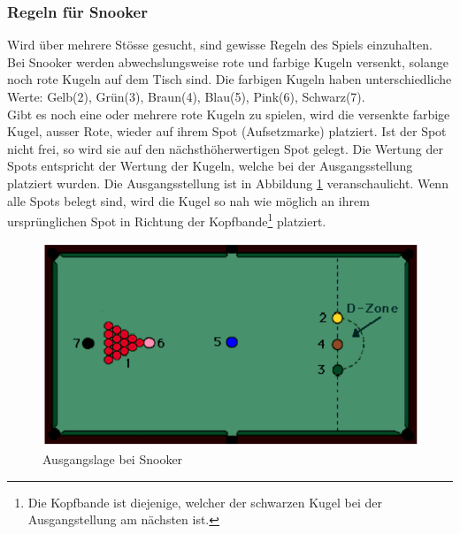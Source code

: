 \subsubsection{Regeln für Snooker}\label{kap:tiefensuche:regeln_fuer_snooker}
Wird über mehrere Stösse gesucht, sind gewisse Regeln des Spiels einzuhalten. Bei Snooker werden abwechslungsweise rote
und farbige Kugeln versenkt, solange noch rote Kugeln auf dem Tisch sind. Die farbigen Kugeln haben unterschiedliche
Werte: Gelb(2), Grün(3), Braun(4), Blau(5), Pink(6), Schwarz(7)\cite{stoppball:spielregel:snooker}.\\
Gibt es noch eine oder mehrere rote Kugeln zu spielen, wird die versenkte farbige Kugel, ausser Rote, wieder
auf ihrem Spot (Aufsetzmarke) platziert. Ist der Spot nicht frei, so wird sie auf den nächsthöherwertigen Spot gelegt. Die Wertung
der Spots entspricht der Wertung der Kugeln, welche bei der Ausgangsstellung platziert wurden. Die Ausgangsstellung ist in
Abbildung \ref{fig:snooker_ausgangslage} veranschaulicht. Wenn alle Spots belegt sind, wird die Kugel so nah wie möglich an ihrem ursprünglichen
Spot in Richtung der Kopfbande\footnote{Die Kopfbande ist diejenige, welcher der schwarzen Kugel bei der Ausgangstellung am
nächsten ist.} platziert\cite{stoppball:spielregel:snooker}.

\begin{figure}[h!]
    \begin{center}
        \includegraphics[width=0.4\linewidth]{../common/03_billiard_ai/resources/39_snooker_ausgangslage.png}
    \end{center}
    \caption{Ausgangslage bei Snooker\cite{stoppball:spielregel:snooker}}
    \label{fig:snooker_ausgangslage}
\end{figure}

